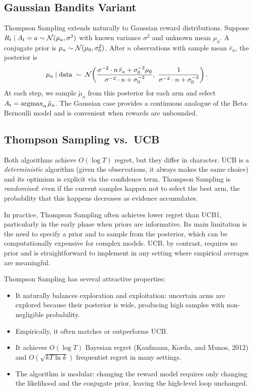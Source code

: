 \subsection*{Gaussian Bandits Variant}

Thompson Sampling extends naturally to Gaussian reward distributions.  Suppose $R_t \mid A_t=a \sim \mathcal{N}(\mu_a, \sigma^2)$ with known variance $\sigma^2$ and unknown mean $\mu_a$.  A conjugate prior is $\mu_a \sim \mathcal{N}(\mu_0, \sigma_0^2)$.  After $n$ observations with sample mean $\bar{r}_a$, the posterior is
\[
\mu_a \mid \text{data} \;\sim\; \mathcal{N}\!\left(\frac{\sigma^{-2}\cdot n\,\bar{r}_a + \sigma_0^{-2}\mu_0}{\sigma^{-2}\cdot n + \sigma_0^{-2}},\;\frac{1}{\sigma^{-2}\cdot n + \sigma_0^{-2}}\right).
\]
At each step, we sample $\tilde\mu_a$ from this posterior for each arm and select $A_t=\operatorname*{argmax}_a\tilde\mu_a$.  The Gaussian case provides a continuous analogue of the Beta-Bernoulli model and is convenient when rewards are unbounded.

\subsection*{Thompson Sampling vs.\ UCB}

Both algorithms achieve $O(\log T)$ regret, but they differ in character.  UCB is a \emph{deterministic} algorithm (given the observations, it always makes the same choice) and its optimism is explicit via the confidence term.  Thompson Sampling is \emph{randomised}: even if the current samples happen not to select the best arm, the probability that this happens decreases as evidence accumulates.

In practice, Thompson Sampling often achieves lower regret than UCB1, particularly in the early phase when priors are informative.  Its main limitation is the need to specify a prior and to sample from the posterior, which can be computationally expensive for complex models.  UCB, by contrast, requires no prior and is straightforward to implement in any setting where empirical averages are meaningful.

\begin{remark}
Thompson Sampling has several attractive properties:
\begin{itemize}[leftmargin=*]
\item It naturally balances exploration and exploitation: uncertain arms are explored because their posterior is wide, producing high samples with non-negligible probability.
\item Empirically, it often matches or outperforms UCB.
\item It achieves $O(\log T)$ Bayesian regret (Kaufmann, Korda, and Munos, 2012) and $O(\sqrt{kT\ln k})$ frequentist regret in many settings.
\item The algorithm is modular: changing the reward model requires only changing the likelihood and the conjugate prior, leaving the high-level loop unchanged.
\end{itemize}
\end{remark}


